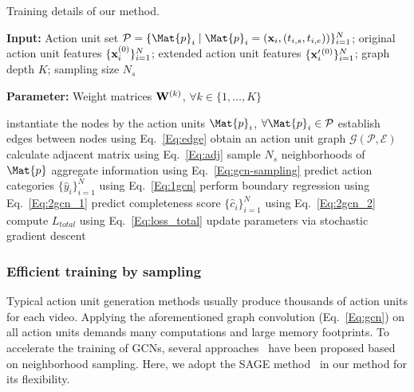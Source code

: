 \documentclass[10pt,journal,compsoc]{IEEEtran}
\begin{document}
	\begin{algorithm}[!bt]
		\caption{Training details of our method.}
		\begin{flushleft}
			\textbf{Input:} Action unit set $\mP=\{\Mat{p}_i\mid\Mat{p}_i=(\bx_i, (t_{i,s}, t_{i,e}))\}_{i=1}^N$;
			original action unit features $\{{\bf x}_{i}^{(0)}\}_{i=1}^N$;
			extended action unit features $\{{\bf x}'_{i}{}^{(0)}\}_{i=1}^N$;
			graph depth $K$; sampling size $N_s$
		\end{flushleft}
		\begin{flushleft}
			\textbf{Parameter:} Weight matrices ${\bf W}^{(k)}$, $\forall k \in \{1,\dots,K\}$
		\end{flushleft}
		\begin{algorithmic}[1]
			\STATE instantiate the nodes by the action units $\Mat{p}_i$, $\forall \Mat{p}_i \in \mP$
			\STATE establish edges between nodes using Eq.~\eqref{Eq:edge}
			\STATE obtain an action unit graph $\mathcal{G}(\mathcal{P}, \mathcal{E})$
			\STATE calculate adjacent matrix using Eq.~\eqref{Eq:adj}
			\STATE sample $N_s$ neighborhoods of $\Mat{p}$
			\STATE aggregate information using Eq.~\eqref{Eq:gcn-sampling}
			\ENDFOR
			\ENDFOR
			\STATE predict action categories $\{\hat{y}_i\}_{i=1}^{N}$ using Eq.~\eqref{Eq:1gcn}
			\STATE perform boundary regression using Eq.~\eqref{Eq:2gcn_1}
			\STATE predict completeness score $\{\hat{c}_i\}_{i=1}^{N}$ using Eq.~\eqref{Eq:2gcn_2}
			\STATE compute $L_{total}$ using Eq.~\eqref{Eq:loss_total}
			\STATE update parameters via stochastic gradient descent
			\ENDWHILE
		\end{algorithmic}
		\label{Alg:forward}
	\end{algorithm}
	
	\subsubsection{Efficient training by sampling}
	\label{Sec:training}
	
	Typical action unit generation methods usually produce thousands of action units for each video. 
	Applying the aforementioned graph convolution (Eq.~\eqref{Eq:gcn}) on all action units demands many computations and large memory footprints. To accelerate the training of GCNs, several approaches~\cite{chen2018fastgcn,huang2018adaptive,hamilton2017inductive} have been proposed based on neighborhood sampling. Here, we adopt the SAGE method~\cite{hamilton2017inductive} in our method for its flexibility. 
	
\end{document}
